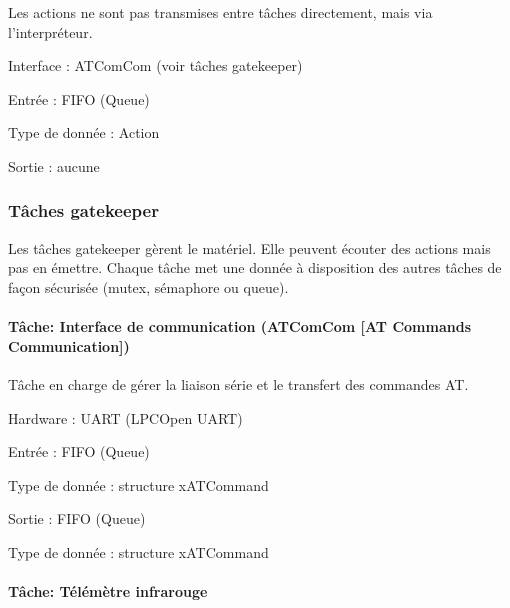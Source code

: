 Les actions ne sont pas transmises entre tâches directement, mais via l'interpréteur.


\begin{DoxyItemize}
\item Interface \-: A\-T\-Com\-Com (voir tâches gatekeeper)
\item Entrée \-: F\-I\-F\-O (Queue)
\begin{DoxyItemize}
\item Type de donnée \-: Action
\end{DoxyItemize}
\item Sortie \-: aucune
\end{DoxyItemize}

\subsubsection*{Tâches gatekeeper}

Les tâches gatekeeper gèrent le matériel. Elle peuvent écouter des actions mais pas en émettre. Chaque tâche met une donnée à disposition des autres tâches de façon sécurisée (mutex, sémaphore ou queue).

\paragraph*{Tâche\-: Interface de communication (A\-T\-Com\-Com \mbox{[}A\-T Commands Communication\mbox{]})}

Tâche en charge de gérer la liaison série et le transfert des commandes A\-T.


\begin{DoxyItemize}
\item Hardware \-: U\-A\-R\-T (L\-P\-C\-Open U\-A\-R\-T)
\item Entrée \-: F\-I\-F\-O (Queue)
\begin{DoxyItemize}
\item Type de donnée \-: structure x\-A\-T\-Command
\end{DoxyItemize}
\item Sortie \-: F\-I\-F\-O (Queue)
\begin{DoxyItemize}
\item Type de donnée \-: structure x\-A\-T\-Command
\end{DoxyItemize}
\end{DoxyItemize}

\paragraph*{Tâche\-: Télémètre infrarouge}

